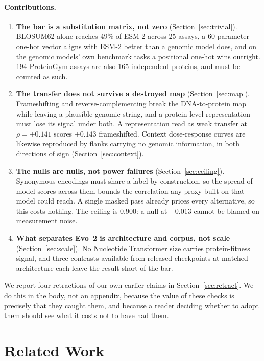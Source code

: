 \documentclass[11pt]{article}
\begin{document}
\paragraph{Contributions.}
\begin{enumerate}\itemsep0pt
\item \textbf{The bar is a substitution matrix, not zero}
(Section~\ref{sec:trivial}). BLOSUM62 alone reaches 49\% of ESM-2 across 25
assays, a 60-parameter one-hot vector aligns with ESM-2 better than a genomic
model does, and on the genomic models' own benchmark tasks a positional one-hot
wins outright. 194 ProteinGym assays are also 165 independent proteins, and must
be counted as such.
\item \textbf{The transfer does not survive a destroyed map}
(Section~\ref{sec:map}). Frameshifting and reverse-complementing break the
DNA-to-protein map while leaving a plausible genomic string, and a protein-level
representation must lose its signal under both. A representation read as weak
transfer at $\rho=+0.141$ scores $+0.143$ frameshifted. Context dose-response
curves are likewise reproduced by flanks carrying no genomic information, in both
directions of sign (Section~\ref{sec:context}).
\item \textbf{The nulls are nulls, not power failures}
(Section~\ref{sec:ceiling}). Synonymous encodings must share a label by
construction, so the spread of model scores across them bounds the correlation any
proxy built on that model could reach. A single masked pass already prices every
alternative, so this costs nothing. The ceiling is $0.900$: a null at $-0.013$
cannot be blamed on measurement noise.
\item \textbf{What separates Evo~2 is architecture and corpus, not scale}
(Section~\ref{sec:scale}). No Nucleotide Transformer size carries protein-fitness
signal, and three contrasts available from released checkpoints at matched
architecture each leave the result short of the bar.
\end{enumerate}

We report four retractions of our own earlier claims in Section~\ref{sec:retract}.
We do this in the body, not an appendix, because the value of these checks is
precisely that they caught them, and because a reader deciding whether to adopt
them should see what it costs not to have had them.

\section{Related Work}
\end{document}
